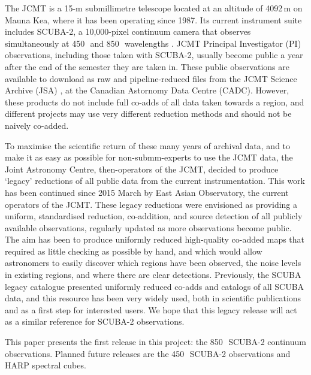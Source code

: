 \documentclass[twocolumn,times]{aastex6}
\newcommand{\um}{\micron}
\begin{document}
The JCMT is a 15-m submillimetre telescope located at an altitude of
4092\,m on Mauna Kea, where it has been operating since 1987. Its
current instrument suite includes SCUBA-2, a 10,000-pixel continuum
camera that observes simultaneously at 450\,\um\ and 850\,\um\
wavelengths \citep{Holland2013}.  JCMT Principal Investigator (PI)
observations, including
those taken with SCUBA-2, usually become public a year after the end
of the semester they are taken in. These public observations are
available to download as raw and pipeline-reduced files from the
JCMT Science Archive (JSA) \citep{2015Economou}, at the Canadian
Astornomy Data Centre (CADC). However, these products do not include
full co-adds of all data taken towards a region, and different projects
may use very different reduction methods and should not be
naively co-added.

To maximise the scientific return of these many years of archival
data, and to make it as easy as possible for non-submm-experts to use
the JCMT data, the Joint Astronomy Centre, then-operators of the JCMT,
decided to produce `legacy' reductions of all public data from the
current instrumentation. This work has been continued since 2015 March
by East Asian Observatory, the current operators of the JCMT. These
legacy reductions were envisioned as providing a uniform, standardised
reduction, co-addition, and source detection of all publicly available
observations, regularly updated as more observations become
public. The aim has been to produce uniformly reduced high-quality
co-added maps that required as little checking as possible by hand,
and which would allow astronomers to easily discover which regions
have been observed, the noise levels in existing regions, and where
there are clear detections. Previously, the SCUBA legacy catalogue
\citep{DiFrancesco2008} presented uniformly reduced co-adds and
catalogs of all SCUBA data, and this resource has been very widely
used, both in scientific publications and as a first step for
interested users. We hope that this legacy release will act as a similar
reference for SCUBA-2 observations.

This paper presents the first release in this project: the 850\,\um\
SCUBA-2 continuum observations. Planned future releases are the
450\,\um\ SCUBA-2 observations and HARP spectral cubes.


\end{document}
